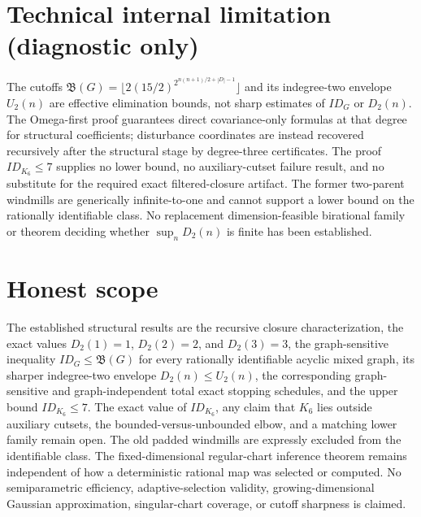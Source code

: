 \documentclass{article}
\begin{document}
\section*{Technical internal limitation (diagnostic only)}

The cutoffs \(\mathfrak B(G)=\lfloor2(15/2)^{2^{n(n+1)/2+|D|-1}}\rfloor\) and its indegree-two envelope \(U_2(n)\) are effective elimination bounds, not sharp estimates of \(ID_G\) or \(D_2(n)\). The Omega-first proof guarantees direct covariance-only formulas at that degree for structural coefficients; disturbance coordinates are instead recovered recursively after the structural stage by degree-three certificates. The proof \(ID_{K_6}\leq7\) supplies no lower bound, no auxiliary-cutset failure result, and no substitute for the required exact filtered-closure artifact. The former two-parent windmills are generically infinite-to-one and cannot support a lower bound on the rationally identifiable class. No replacement dimension-feasible birational family or theorem deciding whether \(\sup_nD_2(n)\) is finite has been established.

\section{Honest scope}

The established structural results are the recursive closure characterization, the exact values \(D_2(1)=1\), \(D_2(2)=2\), and \(D_2(3)=3\), the graph-sensitive inequality \(ID_G\leq\mathfrak B(G)\) for every rationally identifiable acyclic mixed graph, its sharper indegree-two envelope \(D_2(n)\leq U_2(n)\), the corresponding graph-sensitive and graph-independent total exact stopping schedules, and the upper bound \(ID_{K_6}\leq7\). The exact value of \(ID_{K_6}\), any claim that \(K_6\) lies outside auxiliary cutsets, the bounded-versus-unbounded elbow, and a matching lower family remain open. The old padded windmills are expressly excluded from the identifiable class. The fixed-dimensional regular-chart inference theorem remains independent of how a deterministic rational map was selected or computed. No semiparametric efficiency, adaptive-selection validity, growing-dimensional Gaussian approximation, singular-chart coverage, or cutoff sharpness is claimed.
\end{document}
